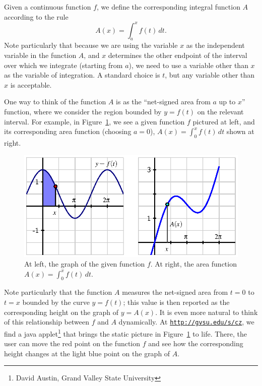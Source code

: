 Given a continuous function $f$, we define the corresponding integral function $A$ according to the rule 
\begin{equation} \label{E:intfxn}
A(x) = \int_a^x f(t) \, dt.
\end{equation}
Note particularly that because we are using the variable $x$ as the independent variable in the function $A$, and $x$ determines the other endpoint of the interval over which we integrate (starting from $a$), we need to use a variable other than $x$ as the variable of integration.  A standard choice is $t$, but any variable other than $x$ is acceptable.

One way to think of the function $A$ is as the ``net-signed area from $a$ up to $x$'' function, where we consider the region bounded by $y = f(t)$ on the relevant interval.  For example, in Figure~\ref{F:5.1.IntFxn}, we see a given function $f$ pictured at left, and its corresponding area function (choosing $a = 0$), $A(x) = \int_0^x f(t) \, dt$ shown at right.

\begin{figure}[h]
\begin{center}
\includegraphics{figures/5_1_IntFxn.eps}
\end{center}
\caption{At left, the graph of the given function $f$.  At right, the area function $A(x) = \int_0^x f(t) \, dt$.} \label{F:5.1.IntFxn}
\end{figure}

Note particularly that the function $A$ measures the net-signed area from $t = 0$ to $t = x$ bounded by the curve $y = f(t)$; this value is then reported as the corresponding height on the graph of $y = A(x)$.  It is even more natural to think of this relationship between $f$ and $A$ dynamically.  At \href{http://gvsu.edu/s/cz}{\texttt{http://gvsu.edu/s/cz}}, we find a java applet\footnote{David Austin, Grand Valley State University} that brings the static picture in Figure~\ref{F:5.1.IntFxn} to life.  There, the user can move the red point on the function $f$ and see how the corresponding height changes at the light blue point on the graph of $A$.

